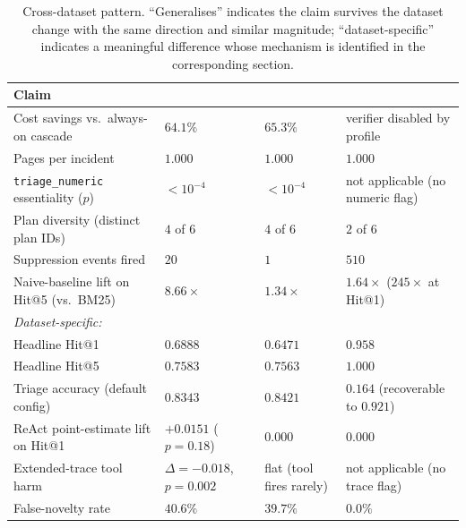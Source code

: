 \begin{table}[t]
  \centering
  \caption{Cross-dataset pattern. ``Generalises'' indicates the claim survives the dataset change with the same direction and similar magnitude; ``dataset-specific'' indicates a meaningful difference whose mechanism is identified in the corresponding section.}
  \label{tab:generalises}
  \small
  \begin{tabular}{llll}
    \toprule
    Claim                                                 & \dsob{}              & \dsotel{}             & \dswol{}              \\
    \midrule
    Cost savings vs.\ always-on cascade                   & $64.1\%$             & $65.3\%$              & verifier disabled by profile \\
    Pages per incident                                    & $1.000$              & $1.000$               & $1.000$               \\
    \texttt{triage\_numeric} essentiality ($p$)           & $<10^{-4}$           & $<10^{-4}$            & not applicable (no numeric flag) \\
    Plan diversity (distinct plan IDs)                    & $4$ of $6$           & $4$ of $6$            & $2$ of $6$ \\
    Suppression events fired                              & $20$                 & $1$                   & $510$                 \\
    Naive-baseline lift on Hit@5 (vs.\ BM25)              & $8.66\times$         & $1.34\times$          & $1.64\times$ ($245\times$ at Hit@1) \\
    \midrule
    \multicolumn{4}{l}{\emph{Dataset-specific:}} \\
    Headline Hit@1                                        & $0.6888$             & $0.6471$              & $\mathbf{0.958}$ \\
    Headline Hit@5                                        & $0.7583$             & $0.7563$              & $\mathbf{1.000}$ \\
    Triage accuracy (default config)                      & $0.8343$             & $0.8421$              & $0.164$ (recoverable to $0.921$) \\
    ReAct point-estimate lift on Hit@1                    & $+0.0151$ ($p=0.18$) & $0.000$               & $0.000$ \\
    Extended-trace tool harm                              & $\Delta=-0.018$, $p=0.002$ & flat (tool fires rarely)              & not applicable (no trace flag) \\
    False-novelty rate                                    & $40.6\%$             & $39.7\%$              & $\mathbf{0.0\%}$ \\
    \bottomrule
  \end{tabular}
\end{table}

